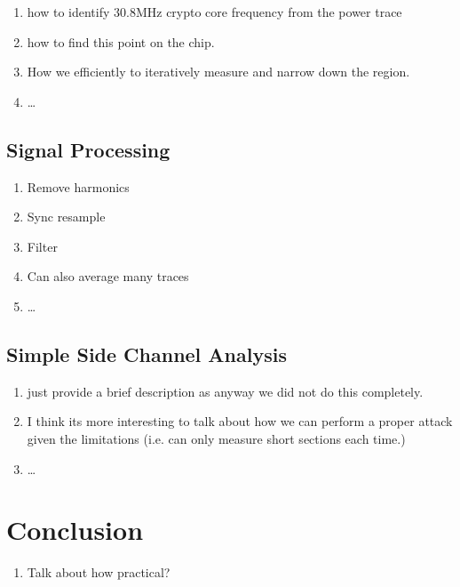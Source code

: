 \documentclass{llncs}
\begin{document}
\begin{enumerate}
  \item how to identify 30.8MHz crypto core frequency from the power trace
  \item how to find this point on the chip. 
  \item How we efficiently to iteratively measure and narrow down the region.
  \item \ldots
\end{enumerate}


\subsection{Signal Processing}

\begin{enumerate}
  \item Remove harmonics
  \item Sync resample
  \item Filter
  \item Can also average many traces
  \item \ldots
\end{enumerate}



\subsection{Simple Side Channel Analysis}

\begin{enumerate}
  \item just provide a brief description as anyway we did not do this completely. 
  \item I think its more interesting to talk about how we can perform a proper attack given the limitations (i.e. can only measure short sections each time.)
  \item \ldots
\end{enumerate}




\section{Conclusion}

\begin{enumerate}
  \item Talk about how practical?
\end{enumerate}




% 
% 
% 
% 
\end{document}
